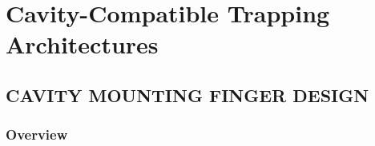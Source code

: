 \documentclass[../Thesis-IJspeert.tex]{subfiles}
\begin{document}
\graphicspath{ {"Cavity-Compatible Trapping Architectures/figs/"} }

\chapter{Cavity-Compatible Trapping Architectures}
\label{chap:CavityCompatibleTrappingArchitectures}

\section{CAVITY MOUNTING FINGER DESIGN}
\subsection{Overview}
\end{document}
